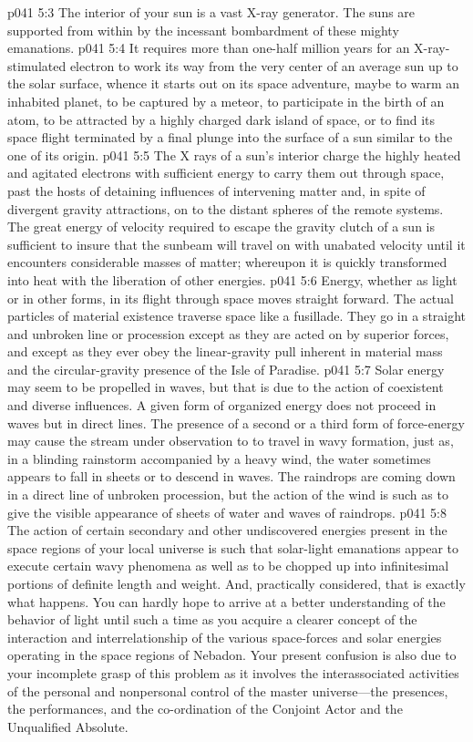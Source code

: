 \vs p041 5:3 The interior of your sun is a vast X\hyp{}ray generator. The suns are supported from within by the incessant bombardment of these mighty emanations.
\vs p041 5:4 It requires more than one\hyp{}half million years for an X\hyp{}ray\hyp{}stimulated electron to work its way from the very center of an average sun up to the solar surface, whence it starts out on its space adventure, maybe to warm an inhabited planet, to be captured by a meteor, to participate in the birth of an atom, to be attracted by a highly charged dark island of space, or to find its space flight terminated by a final plunge into the surface of a sun similar to the one of its origin.
\vs p041 5:5 The X rays of a sun’s interior charge the highly heated and agitated electrons with sufficient energy to carry them out through space, past the hosts of detaining influences of intervening matter and, in spite of divergent gravity attractions, on to the distant spheres of the remote systems. The great energy of velocity required to escape the gravity clutch of a sun is sufficient to insure that the sunbeam will travel on with unabated velocity until it encounters considerable masses of matter; whereupon it is quickly transformed into heat with the liberation of other energies.
\pc \vs p041 5:6 Energy, whether as light or in other forms, in its flight through space moves straight forward. The actual particles of material existence traverse space like a fusillade. They go in a straight and unbroken line or procession except as they are acted on by superior forces, and except as they ever obey the linear\hyp{}gravity pull inherent in material mass and the circular\hyp{}gravity presence of the Isle of Paradise.
\pc \vs p041 5:7 Solar energy may seem to be propelled in waves, but that is due to the action of coexistent and diverse influences. A given form of organized energy does not proceed in waves but in direct lines. The presence of a second or a third form of force\hyp{}energy may cause the stream under observation to  to travel in wavy formation, just as, in a blinding rainstorm accompanied by a heavy wind, the water sometimes appears to fall in sheets or to descend in waves. The raindrops are coming down in a direct line of unbroken procession, but the action of the wind is such as to give the visible appearance of sheets of water and waves of raindrops.
\vs p041 5:8 The action of certain secondary and other undiscovered energies present in the space regions of your local universe is such that solar\hyp{}light emanations appear to execute certain wavy phenomena as well as to be chopped up into infinitesimal portions of definite length and weight. And, practically considered, that is exactly what happens. You can hardly hope to arrive at a better understanding of the behavior of light until such a time as you acquire a clearer concept of the interaction and interrelationship of the various space\hyp{}forces and solar energies operating in the space regions of Nebadon. Your present confusion is also due to your incomplete grasp of this problem as it involves the interassociated activities of the personal and nonpersonal control of the master universe---the presences, the performances, and the co\hyp{}ordination of the Conjoint Actor and the Unqualified Absolute.
